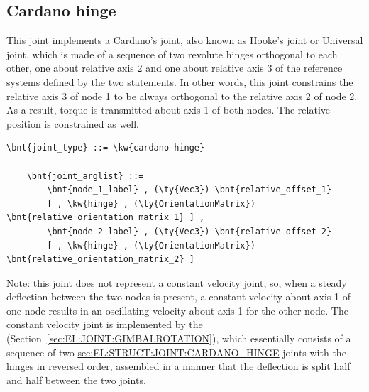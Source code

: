 \subsection{Cardano hinge}
\label{sec:EL:STRUCT:JOINT:CARDANO_HINGE}
This joint implements a Cardano's joint, also known as Hooke's joint
or Universal joint, which is made of a sequence
of two revolute hinges orthogonal to each other, one about relative axis 2
and one about relative axis 3 of the reference systems
defined by the two  statements.
In other words, this joint constrains the relative axis 3 of node 1 
to be always orthogonal to the relative axis 2 of node 2.
As a result, torque is transmitted about axis 1 of both nodes.
The relative position is constrained as well.
\begin{Verbatim}[commandchars=\\\{\}]
    \bnt{joint_type} ::= \kw{cardano hinge}

    \bnt{joint_arglist} ::= 
        \bnt{node_1_label} , (\ty{Vec3}) \bnt{relative_offset_1}
        [ , \kw{hinge} , (\ty{OrientationMatrix}) \bnt{relative_orientation_matrix_1} ] ,
        \bnt{node_2_label} , (\ty{Vec3}) \bnt{relative_offset_2}
        [ , \kw{hinge} , (\ty{OrientationMatrix}) \bnt{relative_orientation_matrix_2} ]
\end{Verbatim}
Note: this joint does not represent a constant velocity joint,
so, when a steady deflection between the two nodes is present,
a constant velocity about axis 1 of one node results in an oscillating
velocity about axis 1 for the other node.
The constant velocity joint is implemented by the 
(Section~\ref{sec:EL:JOINT:GIMBALROTATION}), which essentially consists
of a sequence of two
\hyperref{\kw{cardano hinge}}{\kw{cardano hinge} (see Section~}{)}{sec:EL:STRUCT:JOINT:CARDANO_HINGE}
joints with the hinges in reversed order, assembled
in a manner that the deflection is split half and half
between the two joints.

